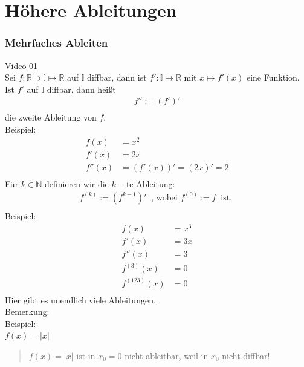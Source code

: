 \chapter{Höhere Ableitungen}

\setcounter{section}{9}
\setcounter{subsection}{0}
\setcounter{subsubsection}{1}
\setcounter{secnumdepth}{4}
\subsection{Mehrfaches Ableiten}
\href{https://youtu.be/CA2VJcrvSVo}{Video 01}\\
Sei $ f:\mathbb{R}\supset\mathbb{I}\longmapsto\mathbb{R} $ auf $ \mathbb{I} $ diffbar, dann ist $ f':\mathbb{I}\longmapsto\mathbb{R} $ mit $ x\longmapsto f'(x) $ eine Funktion.\\
Ist $ f' $ auf $ \mathbb{I} $ diffbar, dann heißt\\
\begin{align*}
f'':=(f')'\\
\end{align*}
die zweite Ableitung von $ f $.\vspace*{4mm}\\
Beispiel:\\
\begin{align*}
f(x)&=x^2\\
f'(x)&=2x\\
f''(x)&=(f'(x))'=(2x)'=2\\
\end{align*}
Für $ k\in \mathbb{N} $ definieren wir die $ k- $te Ableitung:\\
\begin{align*}
f^{(k)}:=(f^{k-1})'\;\;\text{, wobei } f^{(0)}:=f\;\;\text{ist. }\\
\end{align*}
Beispiel:\\
\begin{align*}
f(x)&=x^3\\
f'(x)&=3x\\
f''(x)&=3\\
f^{(3)}(x)&=0\\
f^{(123)}(x)&=0\\
\end{align*}
Hier gibt es unendlich viele Ableitungen.\\
\newpage
\noindent
Bemerkung:\\
Beispiel:\\
\textbullet \;\;$ f(x)=|x| $ \\
\begin{quote}
	$ f(x)=|x| $ ist in $ x_0=0 $ nicht ableitbar, weil in $ x_0 $ nicht diffbar!\\
\end{quote}
